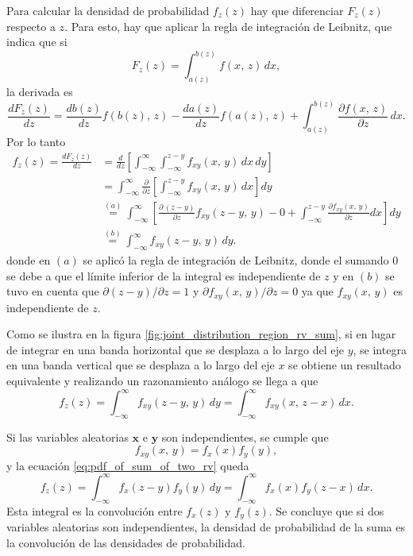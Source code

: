\documentclass[a4paper]{report}
\newcommand{\x}{\mathbf{x}}
\newcommand{\y}{\mathbf{y}}
\begin{document}
Para calcular la densidad de probabilidad \(f_z(z)\) hay que diferenciar \(F_z(z)\) respecto a \(z\). Para esto, hay que aplicar la regla de integración de Leibnitz, que indica que si
\begin{equation}\label{eq:leibnitz_integration_rule1}
 F_z(z)=\int_{a(z)}^{b(z)}f(x,\,z)\,dx,
\end{equation}
la derivada es
\begin{equation}\label{eq:leibnitz_integration_rule2}
 \frac{dF_z(z)}{dz}=\frac{db(z)}{dz}f(b(z),\,z)-\frac{da(z)}{dz}f(a(z),\,z)+\int_{a(z)}^{b(z)}\frac{\partial f(x,\,z)}{\partial z}\,dx.
\end{equation}
Por lo tanto
\begin{align*}
 f_z(z)=\frac{dF_z(z)}{dz}&=\frac{d}{dz}\left[\int_{-\infty}^{\infty}\int_{-\infty}^{z-y}f_{xy}(x,\,y)\,dx\,dy\right]\\
  &=\int_{-\infty}^{\infty}\frac{\partial}{\partial z}\left[\int_{-\infty}^{z-y}f_{xy}(x,\,y)\,dx\right]dy\\
  &\overset{(a)}{=}\int_{-\infty}^{\infty}\left[\frac{\partial\,(z-y)}{\partial z}f_{xy}(z-y,\,y)-0+\int_{-\infty}^{z-y}\frac{\partial f_{xy}(x,\,y)}{\partial z}dx\right]dy\\
  &\overset{(b)}{=}\int_{-\infty}^{\infty}f_{xy}(z-y,\,y)\,dy.
\end{align*}
donde en \((a)\) se aplicó la regla de integración de Leibnitz, donde el sumando 0 se debe a que el límite inferior de la integral es independiente de \(z\) y en \((b)\) se tuvo en cuenta que \(\partial(z-y)/\partial z=1\) y \(\partial f_{xy}(x,\,y)/\partial z=0\) ya que \(f_{xy}(x,\,y)\) es independiente de \(z\). 

Como se ilustra en la figura \ref{fig:joint_distribution_region_rv_sum}, si en lugar de integrar en una banda horizontal que se desplaza a lo largo del eje \(y\), se integra en una banda vertical que se desplaza a lo largo del eje \(x\) se obtiene un resultado equivalente y realizando un razonamiento análogo se llega a que
\begin{equation}\label{eq:pdf_of_sum_of_two_rv}
 f_z(z)=\int_{-\infty}^{\infty}f_{xy}(z-y,\,y)\,dy=\int_{-\infty}^{\infty}f_{xy}(x,\,z-x)\,dx.
\end{equation}

Si las variables aleatorias \(\x\) e \(\y\) son independientes, se cumple que
\[
f_{xy}(x,\,y)=f_x(x)f_y(y), 
\]
y la ecuación \ref{eq:pdf_of_sum_of_two_rv} queda
\begin{equation}\label{eq:pdf_of_sum_of_two_independents_rv}
 f_z(z)=\int_{-\infty}^{\infty}f_x(z-y)f_y(y)\,dy=\int_{-\infty}^{\infty}f_x(x)f_y(z-x)\,dx.
\end{equation}
Esta integral es la convolución entre \(f_x(z)\) y \(f_y(z)\). Se concluye que si dos variables aleatorias son independientes, la densidad de probabilidad de la suma es la convolución de las densidades de probabilidad.
\end{document}

